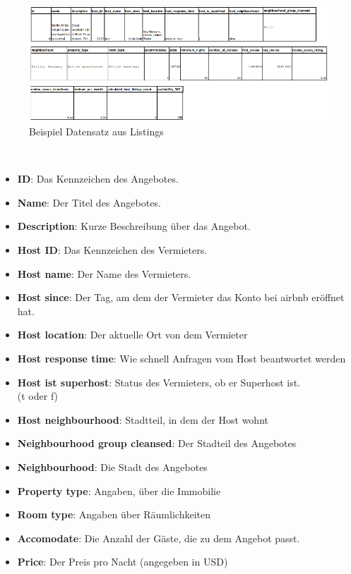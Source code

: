 \documentclass[12pt]{article}
\begin{document}
\begin{text}
\begin{figure}[h]
 \includegraphics[width=1\textwidth]{ListingTabelleNeu.png}
 \caption{Beispiel Datensatz aus Listings}
\end{figure}
\\
\begin{itemize}
    \item \textbf{ID}: Das Kennzeichen des Angebotes.
    \item \textbf{Name}: Der Titel des Angebotes.
    \item \textbf{Description}: Kurze Beschreibung über das Angebot. 
    \item \textbf{Host ID}: Das Kennzeichen des Vermieters.
    \item \textbf{Host name}: Der Name des Vermieters.
    \item \textbf{Host since}: Der Tag, am dem der Vermieter das Konto bei airbnb eröffnet hat.
    \item \textbf{Host location}: Der aktuelle Ort von dem Vermieter 
    \item \textbf{Host response time}: Wie schnell Anfragen vom Host beantwortet werden
    \item \textbf{Host ist superhost}: Status des Vermieters, ob er Superhost ist. \\ (t oder f)
    \item \textbf{Host neighbourhood}: Stadtteil, in dem der Host wohnt
    \item \textbf{Neighbourhood group cleansed}: Der Stadteil des Angebotes
    \item \textbf{Neighbourhood}: Die Stadt des Angebotes
    \item \textbf{Property type}: Angaben, über die Immobilie 
    \item \textbf{Room type}: Angaben über Räumlichkeiten
    \item \textbf{Accomodate}: Die Anzahl der Gäste, die zu dem Angebot passt.
    \item \textbf{Price}: Der Preis pro Nacht (angegeben in USD)

\end{itemize}
\end{text}
\end{document}

